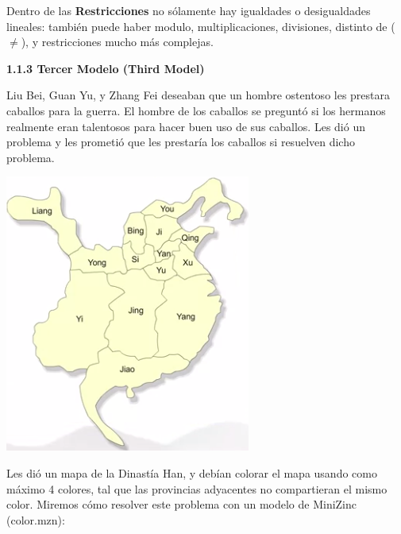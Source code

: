 \documentclass[12pt]{article}
\begin{document}
\begin{justify}
Dentro de las \textbf{Restricciones} no sólamente hay igualdades o desigualdades lineales: también puede haber modulo, multiplicaciones, divisiones, distinto de ($\neq$), y restricciones mucho más complejas.
\end{justify}

\newpage

\textbf{1.1.3 Tercer Modelo (Third Model)}

\begin{justify}
Liu Bei, Guan Yu, y Zhang Fei deseaban que un hombre ostentoso les prestara caballos para la guerra. El hombre de los caballos se preguntó si los hermanos realmente eran talentosos para hacer buen uso de sus caballos. Les dió un problema y les prometió que les prestaría los caballos si resuelven dicho problema.
\end{justify}

\begin{center}
\includegraphics[scale=0.5]{han}
\end{center}

\begin{justify}
Les dió un mapa de la Dinastía Han, y debían colorar el mapa usando como máximo 4 colores, tal que las provincias adyacentes no compartieran el mismo color. Miremos cómo resolver este problema con un modelo de MiniZinc (color.mzn):
\end{justify}
\end{document}
